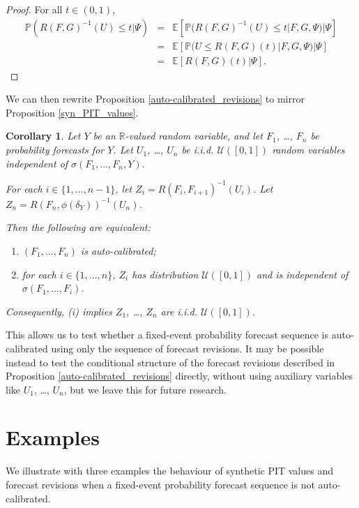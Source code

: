 \documentclass[aap]{imsart}
\theoremstyle{plain}
\newtheorem{corollary}[theorem]{Corollary}
\theoremstyle{definition}
\begin{document}
\begin{proof}
For all $t \in (0,1)$,
\begin{eqnarray*}
  \mathbb{P}(R(F, G)^{-1}(U) \leq t|\Psi) & = & \mathbb{E}[\mathbb{P}(R(F, G)^{-1}(U) \leq t|F, G, \Psi)|\Psi] \\
                                          & = & \mathbb{E}[\mathbb{P}(U \leq R(F, G)(t)|F, G, \Psi)|\Psi] \\
                                          & = & \mathbb{E}[R(F, G)(t)|\Psi].
\end{eqnarray*}
\end{proof}

We can then rewrite Proposition \ref{auto-calibrated_revisions} to mirror Proposition \ref{syn_PIT_values}.

\begin{corollary}
  Let $Y$ be an $\mathbb{R}$-valued random variable, and let $F_1$, \ldots, $F_n$ be probability forecasts for $Y$. Let $U_1$, \ldots, $U_n$ be i.i.d. $\mathcal{U}([0,1])$ random variables independent of $\sigma(F_1, \ldots, F_n, Y)$.

  For each $i \in \{1, \ldots, n-1\}$, let $Z_i = R(F_i, F_{i+1})^{-1}(U_i)$. Let $Z_n = R(F_n, \phi(\delta_Y))^{-1}(U_n)$.

  Then the following are equivalent:
\begin{enumerate}[label=(\roman*)]
  \item $(F_1, \ldots, F_n)$ is auto-calibrated;
  \item for each $i \in \{1, \ldots, n\}$, $Z_i$ has distribution $\mathcal{U}([0,1])$ and is independent of $\sigma(F_1, \ldots, F_i)$.
\end{enumerate}

Consequently, {\normalfont (i)} implies $Z_1$, \ldots, $Z_n$ are i.i.d. $\mathcal{U}([0,1])$.
\end{corollary}

This allows us to test whether a fixed-event probability forecast sequence is auto-calibrated using only the sequence of forecast revisions. It may be possible instead to test the conditional structure of the forecast revisions described in Proposition \ref{auto-calibrated_revisions} directly, without using auxiliary variables like $U_1$, \ldots, $U_n$, but we leave this for future research.

\section{Examples}\label{examples}
We illustrate with three examples the behaviour of synthetic PIT values and forecast revisions when a fixed-event probability forecast sequence is not auto-calibrated.
\end{document}

